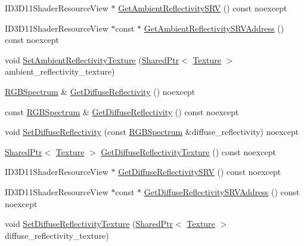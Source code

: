 \begin{DoxyCompactItemize}
\item 
I\+D3\+D11\+Shader\+Resource\+View $\ast$ \hyperlink{structmage_1_1_shaded_material_ae5e18984deccbd70ec76709e417b949f}{Get\+Ambient\+Reflectivity\+S\+RV} () const noexcept
\item 
I\+D3\+D11\+Shader\+Resource\+View $\ast$const  $\ast$ \hyperlink{structmage_1_1_shaded_material_a854b166ed33ab748910d98a0ea6bd4d1}{Get\+Ambient\+Reflectivity\+S\+R\+V\+Address} () const noexcept
\item 
void \hyperlink{structmage_1_1_shaded_material_aacf12d6f3ed2b55c90366790345c6fd6}{Set\+Ambient\+Reflectivity\+Texture} (\hyperlink{namespacemage_a1e01ae66713838a7a67d30e44c67703e}{Shared\+Ptr}$<$ \hyperlink{classmage_1_1_texture}{Texture} $>$ ambient\+\_\+reflectivity\+\_\+texture)
\item 
\hyperlink{structmage_1_1_r_g_b_spectrum}{R\+G\+B\+Spectrum} \& \hyperlink{structmage_1_1_shaded_material_a3e292664418846588d1e5cdc9ddc8ab5}{Get\+Diffuse\+Reflectivity} () noexcept
\item 
const \hyperlink{structmage_1_1_r_g_b_spectrum}{R\+G\+B\+Spectrum} \& \hyperlink{structmage_1_1_shaded_material_ae2c5d441c51b40a3c940785a002f59ec}{Get\+Diffuse\+Reflectivity} () const noexcept
\item 
void \hyperlink{structmage_1_1_shaded_material_a2da4b314ab2f92659cbed167cc1f32c9}{Set\+Diffuse\+Reflectivity} (const \hyperlink{structmage_1_1_r_g_b_spectrum}{R\+G\+B\+Spectrum} \&diffuse\+\_\+reflectivity) noexcept
\item 
\hyperlink{namespacemage_a1e01ae66713838a7a67d30e44c67703e}{Shared\+Ptr}$<$ \hyperlink{classmage_1_1_texture}{Texture} $>$ \hyperlink{structmage_1_1_shaded_material_a461a080a923578673ce04c83cc3d9dbd}{Get\+Diffuse\+Reflectivity\+Texture} () const noexcept
\item 
I\+D3\+D11\+Shader\+Resource\+View $\ast$ \hyperlink{structmage_1_1_shaded_material_a4e163bd276e41b01973a5d968f6f5716}{Get\+Diffuse\+Reflectivity\+S\+RV} () const noexcept
\item 
I\+D3\+D11\+Shader\+Resource\+View $\ast$const  $\ast$ \hyperlink{structmage_1_1_shaded_material_ac16eeb140fbe15f410021ad56c8d7f6d}{Get\+Diffuse\+Reflectivity\+S\+R\+V\+Address} () const noexcept
\item 
void \hyperlink{structmage_1_1_shaded_material_add7475d986df558d289952a6ae2dbd73}{Set\+Diffuse\+Reflectivity\+Texture} (\hyperlink{namespacemage_a1e01ae66713838a7a67d30e44c67703e}{Shared\+Ptr}$<$ \hyperlink{classmage_1_1_texture}{Texture} $>$ diffuse\+\_\+reflectivity\+\_\+texture)

\end{DoxyCompactItemize}
